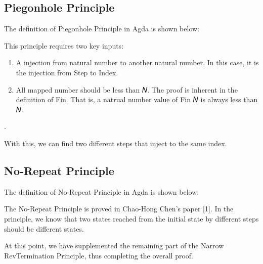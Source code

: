 \subsection{ Piegonhole Principle }
The definition of Piegonhole Principle in Agda is shown below:



This principle requires two key inputs:
\begin{enumerate}[1.]
    \item A injection from natural number to another natural number. In this case, it is the injection from Step to Index. 
    \item All mapped number should be less than 𝑁.  The proof is inherent in the definition of Fin.  That is, a natrual number value of Fin 𝑁 is always less than 𝑁.
\end{enumerate}.

With this, we can find two different steps that inject to the same index.

\subsection{ No-Repeat Principle }
The definition of No-Repeat Principle in Agda is shown below:

The No-Repeat Principle is proved in Chao-Hong Chen's paper [1].  
In the principle, we know that two states reached from the initial state by different steps should be different states.


At this point, we have supplemented the remaining part of the Narrow RevTermination Principle, thus completing the overall proof.